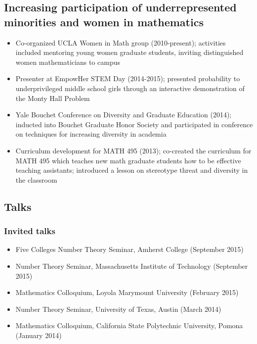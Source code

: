 \documentclass[12pt]{amsart}
\begin{document}
\subsection*{Increasing participation of underrepresented minorities and women in mathematics}
\begin{itemize}
\item Co-organized UCLA Women in Math group (2010-present); activities included mentoring young women graduate students, inviting distinguished women mathematicians to campus
\item Presenter at EmpowHer STEM Day (2014-2015); presented probability to underprivileged middle school girls through an interactive demonstration of the Monty Hall Problem
\item Yale Bouchet Conference on Diversity and Graduate Education (2014); inducted into Bouchet Graduate Honor Society and participated in conference on techniques for increasing diversity in academia
\item Curriculum development for MATH 495 (2013); co-created the curriculum for MATH 495 which teaches new math graduate students how to be effective teaching assistants; introduced a lesson on stereotype threat and diversity in the classroom
\end{itemize}
\subsection*{Talks}
\subsubsection*{Invited talks}
\begin{itemize}
\item Five Colleges Number Theory Seminar, Amherst College (September 2015)
\item Number Theory Seminar, Massachusetts Institute of Technology (September 2015)
\item Mathematics Colloquium, Loyola Marymount University (February 2015)
\item Number Theory Seminar, University of Texas, Austin (March 2014)
\item Mathematics Colloquium, California State Polytechnic University, Pomona (January 2014)
\end{itemize}
\end{document}
